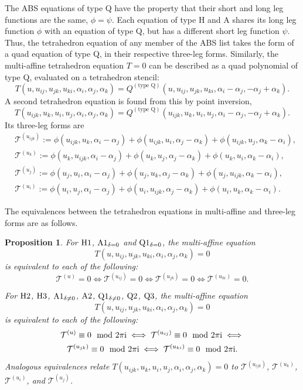 \documentclass[pdftex]{sigma}
\newtheorem{Proposition}[Definition]{Proposition}
\numberwithin{equation}{section}
\begin{document}
The ABS equations of type Q have the property that their short and long leg functions are the same, $\phi=\psi$. Each equation of type H and A shares its long leg function $\phi$ with an equation of type Q, but has a different short leg function $\psi$.
Thus, the tetrahedron equation of any member of the ABS list takes the form of a quad equation of type Q, in their respective three-leg forms. Similarly, the multi-affine tetrahedron equation $T=0$ can be described as a quad polynomial of type Q, evaluated on a tetrahedron stencil:
\[ T(u,u_{ij},u_{jk},u_{ki},\alpha_i,\alpha_j,\alpha_k)
 = Q^{(\text{type Q})}(u,u_{ij},u_{jk},u_{ki},\alpha_i-\alpha_j,-\alpha_j+\alpha_k) . \]
A second tetrahedron equation is found from this by point inversion,
\[ T(u_{ijk},u_{k},u_{i},u_{j},\alpha_i,\alpha_j,\alpha_k)
 = Q^{(\text{type Q})}(u_{ijk},u_{k},u_{i},u_{j},\alpha_i-\alpha_j,-\alpha_j+\alpha_k) . \]
Its three-leg forms are
\begin{align}
 &\mathcal{T}^{(u_{ijk})}:= \phi(u_{ijk},u_{k},\alpha_i-\alpha_j) + \phi(u_{ijk},u_{i},\alpha_j-\alpha_k) + \phi(u_{ijk},u_{j},\alpha_k-\alpha_i) ,\label{tetra-uijk}
 \\
	&\mathcal{T}^{(u_{k})}:= \phi(u_{k},u_{ijk},\alpha_i-\alpha_j) + \phi(u_{k},u_{j},\alpha_j-\alpha_k) + \phi(u_{k},u_{i}, \alpha_k-\alpha_i) \label{tetra-uk} ,\\
	&\mathcal{T}^{(u_{j})}:= \phi(u_{j},u_{i},\alpha_i-\alpha_j) + \phi(u_{j},u_{k},\alpha_j-\alpha_k) + \phi(u_{j},u_{ijk}, \alpha_k-\alpha_i) \label{tetra-uj} ,\\
	&\mathcal{T}^{(u_{i})}:= \phi(u_{i},u_{j},\alpha_i-\alpha_j) + \phi(u_{i},u_{ijk},\alpha_j-\alpha_k) + \phi(u_{i},u_{k}, \alpha_k-\alpha_i) \label{tetra-ui} .
\end{align}

The equivalences between the tetrahedron equations in multi-affine and three-leg forms are as follows.
\begin{Proposition}
 For ${\rm H}1$, ${\rm A}1_{\delta=0}$ and ${\rm Q}1_{\delta=0}$, the multi-affine equation
 \[ T(u,u_{ij},u_{jk},u_{ki},\alpha_i,\alpha_j,\alpha_k) = 0\] is equivalent to each of the following:
 \[ \mathcal{T}^{(u)} = 0 \iff \mathcal{T}^{(u_{ij})} = 0 \iff \mathcal{T}^{(u_{jk})} = 0 \iff \mathcal{T}^{(u_{ki})} = 0 .\]

 For ${\rm H}2$, ${\rm H}3$, ${\rm A}1_{\delta\neq0}$, ${\rm A}2$, ${\rm Q}1_{\delta\neq0}$, ${\rm Q}2$, ${\rm Q}3$,
 the multi-affine equation
 \[ T(u,u_{ij},u_{jk},u_{ki},\alpha_i,\alpha_j,\alpha_k) = 0\] is equivalent to each of the following:
 \begin{gather*}
 \mathcal{T}^{(u)} \equiv 0 \mod 2 \pi {\rm i} \iff
 \mathcal{T}^{(u_{ij})} \equiv 0 \mod 2 \pi {\rm i} \iff \\
 \mathcal{T}^{(u_{jk})} \equiv 0 \mod 2 \pi {\rm i} \iff
 \mathcal{T}^{(u_{ki})} \equiv 0 \mod 2 \pi {\rm i} .
 \end{gather*}
Analogous equivalences relate $T(u_{ijk},u_{k},u_{i},u_{j},\alpha_i,\alpha_j,\alpha_k) = 0$ to $\mathcal{T}^{(u_{ijk})}$, $\mathcal{T}^{(u_{k})}$, $\mathcal{T}^{(u_{i})}$, and $\mathcal{T}^{(u_{j})}$.
\end{Proposition}
\end{document}
